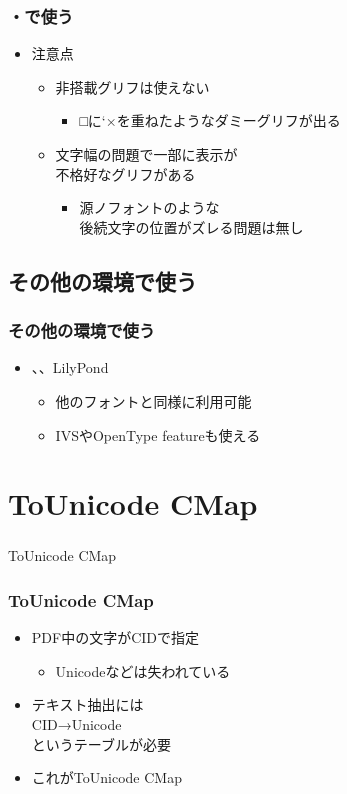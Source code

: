 \begin{frame}\frametitle{\pTeX ・\upTeX で使う}
  \begin{itemize}
  \item 注意点
    \begin{itemize}
    \item 非搭載グリフは使えない
      \begin{itemize}
      \item □に\ltjjachar`×を重ねたようなダミーグリフが出る
      \end{itemize}
    \item 文字幅の問題で一部に表示が \\
      不格好なグリフがある
      \begin{itemize}
      \item 源ノフォントのような \\
        後続文字の位置がズレる問題は無し
      \end{itemize}
    \end{itemize}
  \end{itemize}
\end{frame}

\subsection{その他の環境で使う}
\begin{frame}\frametitle{その他の環境で使う}
  \begin{itemize}
  \item \LuaTeX 、\XeTeX 、LilyPond
    \begin{itemize}
    \item 他のフォントと同様に利用可能
    \item IVSやOpenType featureも使える
    \end{itemize}
  \end{itemize}
\end{frame}

\section{ToUnicode CMap}
\begin{frame}\frametitle{}
  \centering
  ToUnicode CMap
\end{frame}

\begin{frame}\frametitle{ToUnicode CMap}
  \begin{itemize}
  \item PDF中の文字がCIDで指定
    \begin{itemize}
    \item Unicodeなどは失われている
    \end{itemize}
  \item テキスト抽出には \\
    CID→Unicode \\
    というテーブルが必要
  \item これがToUnicode CMap
  \end{itemize}
\end{frame}

